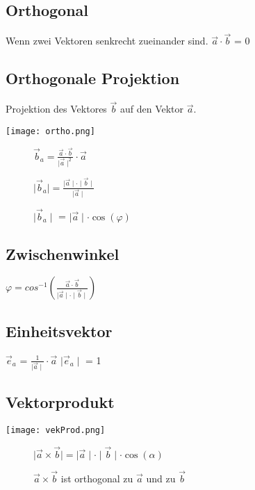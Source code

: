 \begin{multicols*}{3}
\WhiteSpace
\subsection{Orthogonal}
{Wenn zwei Vektoren senkrecht zueinander sind.}
$ \vec{a} \cdot \vec{b} $ = 0
\WhiteSpace
\subsection{Orthogonale Projektion}
{Projektion des Vektores $\vec{b} $ auf den Vektor $\vec{a} $.}

 \texttt{[image: ortho.png]} 

\begin{wrapfigure}{r}{4.5cm}
 \vspace{-70pt}
 $\vec{b}_a = \frac{\vec{a} \cdot  \vec{b}}{\mid \vec{a} \mid ^2} \cdot \vec{a} $

$\mid \vec{b}_a  \mid  = \frac{\mid \vec{a} \mid \cdot \mid \vec{b} \mid}{\mid \vec{a} \mid }$ 


$ \mid \vec{b}_a \mid $ = $\mid \vec{a} \mid \cdot \cos(\varphi)$

\end{wrapfigure}



\WhiteSpace
\subsection{Zwischenwinkel}
{$\varphi = cos^{-1}(\frac{\vec{a}\cdot\vec{b}}{\mid \vec{a} \mid \cdot \mid \vec{b} \mid}) $}
\WhiteSpace
\subsection{Einheitsvektor}
{$\vec{e}_a $ = $\frac{1}{\mid \vec{a} \mid} \cdot \vec{a}$}
{$\mid \vec{e}_a \mid$ = 1}

\subsection{Vektorprodukt}

 \texttt{[image: vekProd.png]} 


\begin{wrapfigure}{r}{5.5cm}
 \vspace{-70pt}
 $ \mid \vec{a} \times \vec{b} \mid = \mid\vec{a}\mid \cdot \mid\vec{b}\mid \cdot \cos(\alpha) $
 
{$\vec{a} \times \vec{b}$ ist orthogonal zu $\vec{a}$ und zu $\vec{b}$}
\end{wrapfigure}


\end{multicols*}

